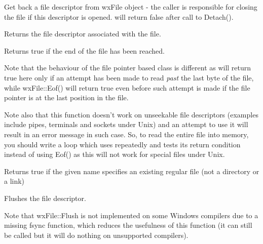 
Get back a file descriptor from wxFile object - the caller is responsible for closing the file if this
descriptor is opened.  will return false after call to Detach().

\label{wxfilefd}


Returns the file descriptor associated with the file.

\label{wxfileeof}


Returns true if the end of the file has been reached.

Note that the behaviour of the file pointer based class 
 is different as  
will return true here only if an attempt has been made to read 
{\it past} the last byte of the file, while wxFile::Eof() will return true
even before such attempt is made if the file pointer is at the last position
in the file.

Note also that this function doesn't work on unseekable file descriptors
(examples include pipes, terminals and sockets under Unix) and an attempt to
use it will result in an error message in such case. So, to read the entire
file into memory, you should write a loop which uses 
 repeatedly and tests its return condition instead
of using Eof() as this will not work for special files under Unix.

\label{wxfileexists}


Returns true if the given name specifies an existing regular file (not a
directory or a link)

\label{wxfileflush}


Flushes the file descriptor.

Note that wxFile::Flush is not implemented on some Windows compilers
due to a missing fsync function, which reduces the usefulness of this function
(it can still be called but it will do nothing on unsupported compilers).

\label{wxfileisopened}


